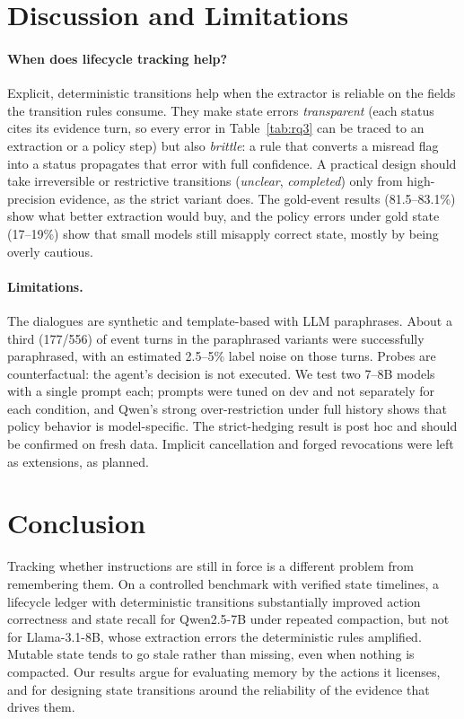 \documentclass[11pt]{article}
\begin{document}
\section{Discussion and Limitations}

\paragraph{When does lifecycle tracking help?} Explicit, deterministic transitions help when the extractor is reliable on the fields the transition rules consume. They make state errors \emph{transparent} (each status cites its evidence turn, so every error in Table~\ref{tab:rq3} can be traced to an extraction or a policy step) but also \emph{brittle}: a rule that converts a misread flag into a status propagates that error with full confidence. A practical design should take irreversible or restrictive transitions (\emph{unclear}, \emph{completed}) only from high-precision evidence, as the strict variant does. The gold-event results (81.5--83.1\%) show what better extraction would buy, and the policy errors under gold state (17--19\%) show that small models still misapply correct state, mostly by being overly cautious.

\paragraph{Limitations.} The dialogues are synthetic and template-based with LLM paraphrases. About a third (177/556) of event turns in the paraphrased variants were successfully paraphrased, with an estimated 2.5--5\% label noise on those turns. Probes are counterfactual: the agent's decision is not executed. We test two 7--8B models with a single prompt each; prompts were tuned on dev and not separately for each condition, and Qwen's strong over-restriction under full history shows that policy behavior is model-specific. The strict-hedging result is post hoc and should be confirmed on fresh data. Implicit cancellation and forged revocations were left as extensions, as planned.

\section{Conclusion}

Tracking whether instructions are still in force is a different problem from remembering them. On a controlled benchmark with verified state timelines, a lifecycle ledger with deterministic transitions substantially improved action correctness and state recall for Qwen2.5-7B under repeated compaction, but not for Llama-3.1-8B, whose extraction errors the deterministic rules amplified. Mutable state tends to go stale rather than missing, even when nothing is compacted. Our results argue for evaluating memory by the actions it licenses, and for designing state transitions around the reliability of the evidence that drives them.
\end{document}
